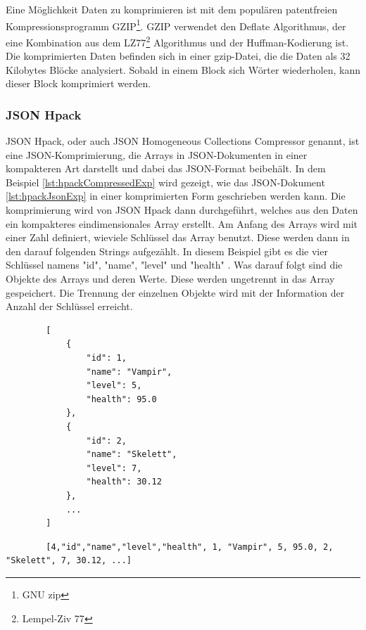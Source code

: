 Eine Möglichkeit Daten zu komprimieren ist mit dem populären patentfreien Kompressionsprogramm GZIP\footnote{GNU zip}. 
GZIP verwendet den Deflate Algorithmus, der eine Kombination aus dem  LZ77\footnote{Lempel-Ziv 77} Algorithmus und der Huffman-Kodierung ist. Die komprimierten Daten befinden sich in einer gzip-Datei, die die Daten als 32 Kilobytes Blöcke analysiert. Sobald in einem Block sich Wörter wiederholen, kann dieser Block komprimiert werden. 
\cite{gnuGzip}\cite{1414952}\cite{seobilityGzipFunktioniert}

\subsubsection{JSON Hpack}
JSON Hpack, oder auch JSON Homogeneous Collections Compressor genannt, ist eine JSON-Komprimierung, die Arrays in JSON-Dokumenten in einer kompakteren Art darstellt und dabei das JSON-Format beibehält. In dem Beispiel \ref{lst:hpackCompressedExp} wird gezeigt, wie das JSON-Dokument \ref{lst:hpackJsonExp} in einer komprimierten Form geschrieben werden kann. Die komprimierung wird von JSON Hpack dann durchgeführt, welches aus den Daten ein kompakteres eindimensionales Array erstellt. Am Anfang des Arrays wird mit einer Zahl definiert, wieviele Schlüssel das Array benutzt. Diese werden dann in den darauf folgenden Strings aufgezählt. In diesem Beispiel gibt es die vier Schlüssel namens "id", "name", "level" und "health" . Was darauf folgt sind die Objekte des Arrays und deren Werte. Diese werden ungetrennt in das Array gespeichert. Die Trennung der einzelnen Objekte wird mit der Information der Anzahl der Schlüssel erreicht.
\cite{webreflectionLastVersion}

\begin{listing}[htp]
    \begin{verbatim} 
        [
            {
                "id": 1,
                "name": "Vampir",
                "level": 5,
                "health": 95.0
            },
            {
                "id": 2,
                "name": "Skelett",
                "level": 7,
                "health": 30.12
            },
            ...
        ]                   
    \end{verbatim}
    \caption{}
    \label{lst:hpackJsonExp}
\end{listing}

\begin{listing}[htp]
    \begin{verbatim} 
        [4,"id","name","level","health", 1, "Vampir", 5, 95.0, 2, "Skelett", 7, 30.12, ...]                  
    \end{verbatim}
    \caption{}
    \label{lst:hpackCompressedExp}
\end{listing}

